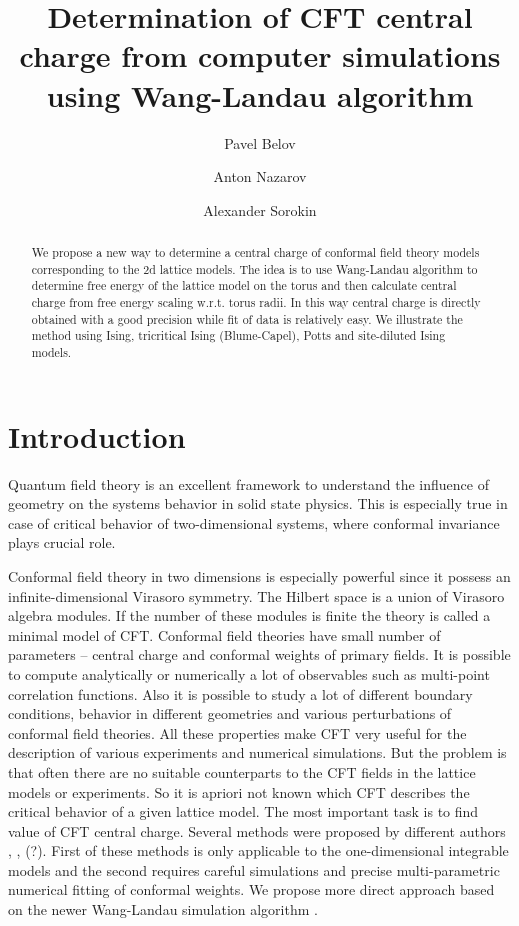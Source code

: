 \documentclass[aps,prl,reprint]{revtex4-1}
\begin{document}
\title{Determination of CFT central charge from computer simulations using Wang-Landau algorithm}
\author{Pavel Belov}
\author{Anton Nazarov}
\author{Alexander Sorokin}



\begin{abstract}
  We propose a new way to determine a central charge of conformal field theory models corresponding
  to the 2d lattice models. The idea is to use Wang-Landau algorithm to determine free energy of the
  lattice model on the torus and then calculate central charge from free energy scaling w.r.t. torus
  radii. In this way central charge is directly obtained with a good precision while fit of data is
  relatively easy. We illustrate the method using Ising, tricritical Ising (Blume-Capel), Potts and
  site-diluted Ising models.
\end{abstract}

\maketitle

\section{Introduction}
\label{sec:introduction}

Quantum field theory is an excellent framework to understand the influence of geometry on the
systems behavior in solid state physics. This is especially true in case of critical behavior of
two-dimensional systems, where conformal invariance plays crucial role. 

Conformal field theory in two dimensions is especially powerful since it possess an
infinite-dimensional Virasoro symmetry. The Hilbert space is a union of Virasoro algebra modules. If
the number of these modules is finite the theory is called a minimal model of CFT. Conformal field
theories have small number of parameters -- central charge and conformal weights of primary fields.
It is possible to compute analytically or numerically a lot of observables such as multi-point
correlation functions. Also it is possible to study a lot of different boundary conditions, behavior
in different geometries and various perturbations of conformal field theories. All these properties
make CFT very useful for the description of various experiments and numerical simulations. But the
problem is that often there are no suitable counterparts to the CFT fields in the lattice models or
experiments. So it is apriori not known which CFT describes the critical behavior of a given lattice
model. The most important task is to find value of CFT central charge. Several methods were proposed
by different authors \cite{feiguin2007interacting}, \cite{bastiaansen1998monte},
\cite{lauwers1991estimation} (?). First of these methods is only applicable to the one-dimensional
integrable models and the second requires careful simulations and precise multi-parametric numerical
fitting of conformal weights. We propose more direct approach based on the newer Wang-Landau
simulation algorithm \cite{wang2001efficient}.
\end{document}
